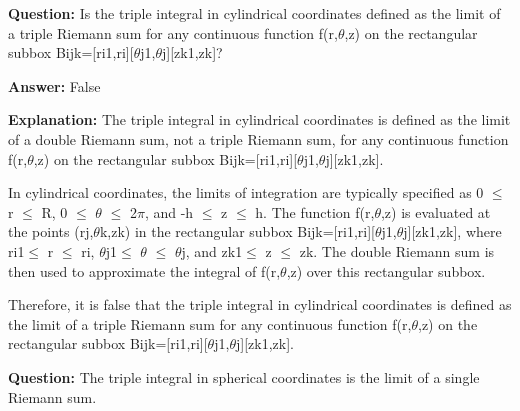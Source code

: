 \documentclass{article}
\begin{document}
                \vspace{0.5cm} 
        
            
                \textbf {Question:} Is the triple integral in cylindrical coordinates defined as the limit of a triple Riemann sum for any continuous function f(r,\ensuremath{\theta},z) on the rectangular subbox Bijk=[ri{\textendash}1,ri]{\texttimes}[\ensuremath{\theta}j{\textendash}1,\ensuremath{\theta}j]{\texttimes}[zk{\textendash}1,zk]?
                
                \textbf{Answer:} False

                \textbf{Explanation:} The triple integral in cylindrical coordinates is defined as the limit of a double Riemann sum, not a triple Riemann sum, for any continuous function f(r,\ensuremath{\theta},z) on the rectangular subbox Bijk=[ri{\textendash}1,ri]{\texttimes}[\ensuremath{\theta}j{\textendash}1,\ensuremath{\theta}j]{\texttimes}[zk{\textendash}1,zk]. 

In cylindrical coordinates, the limits of integration are typically specified as 0 \ensuremath{\leq} r \ensuremath{\leq} R, 0 \ensuremath{\leq} \ensuremath{\theta} \ensuremath{\leq} 2\ensuremath{\pi}, and -h \ensuremath{\leq} z \ensuremath{\leq} h. The function f(r,\ensuremath{\theta},z) is evaluated at the points (rj,\ensuremath{\theta}k,zk) in the rectangular subbox Bijk=[ri{\textendash}1,ri]{\texttimes}[\ensuremath{\theta}j{\textendash}1,\ensuremath{\theta}j]{\texttimes}[zk{\textendash}1,zk], where ri{\textendash}1\ensuremath{\leq} r \ensuremath{\leq} ri, \ensuremath{\theta}j{\textendash}1\ensuremath{\leq} \ensuremath{\theta} \ensuremath{\leq} \ensuremath{\theta}j, and zk{\textendash}1\ensuremath{\leq} z \ensuremath{\leq} zk. The double Riemann sum is then used to approximate the integral of f(r,\ensuremath{\theta},z) over this rectangular subbox. 

Therefore, it is false that the triple integral in cylindrical coordinates is defined as the limit of a triple Riemann sum for any continuous function f(r,\ensuremath{\theta},z) on the rectangular subbox Bijk=[ri{\textendash}1,ri]{\texttimes}[\ensuremath{\theta}j{\textendash}1,\ensuremath{\theta}j]{\texttimes}[zk{\textendash}1,zk].
                
                \vspace{0.5cm} 
        
            
            
                \textbf {Question:} The triple integral in spherical coordinates is the limit of a single Riemann sum.
                
\end{document}
